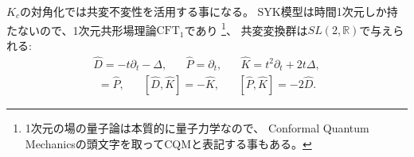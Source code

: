 $K_c$の対角化では共変不変性を活用する事になる。
SYK模型は時間1次元しか持たないので、1次元共形場理論$\mathrm{CFT}_1$であり
\footnote{1次元の場の量子論は本質的に量子力学なので、
Conformal Quantum Mechanicsの頭文字を取ってCQMと表記する事もある。}、
共変変換群は$SL(2, \mathbb{R})$で与えられる\cite{andrzejewski}:
\begin{align}
	\hat{D} = -t\partial_t - \Delta, \hspace{20pt}
	\hat{P} = \partial_t, \hspace{20pt}
	\hat{K} = t^2\partial_t + 2t\Delta,
\end{align}
\begin{align}
	[\hat{D}, \hat{P}] = \hat{P},\hspace{20pt}
	[\hat{D}, \hat{K}] = -\hat{K},\hspace{20pt}
	[\hat{P}, \hat{K}] = -2\hat{D}.
\end{align}

\pagebreak
